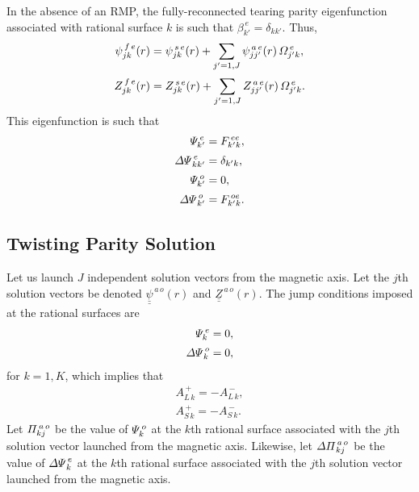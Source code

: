 \documentclass[12pt,prb,aps,notitlepage]{revtex4-1}
\begin{document}
In the absence of an RMP, the fully-reconnected tearing parity eigenfunction associated with rational surface $k$ is such that $\beta^{\,e}_{k'} = \delta_{kk'}$. 
Thus,
\begin{align}
\psi^{\,f\,e}_{jk}(r) &= \psi^{\,s\,e}_{jk}(r) + \sum_{j'=1,J} \psi_{jj'}^{\,a\,e}(r)\,{\mit\Omega}^{\,e}_{j'k},\\[0.5ex]
Z^{\,f\,e}_{jk}(r) &= Z^{\,s\,e}_{jk}(r) + \sum_{j'=1,J} Z_{jj'}^{\,a\,e}(r)\,{\mit\Omega}^{\,e}_{j'k}.
\end{align}
This eigenfunction is such that
\begin{align}
{\mit\Psi}^{\,e}_{k'} &= F^{\,ee}_{k'k},\\[0.5ex]
{\mit\Delta\Psi}^{\,e}_{kk'} &= \delta_{k'k},\\[0.5ex]
{\mit\Psi}^{\,o}_{k'} &= 0,\\[0.5ex]
{\mit\Delta\Psi}^{\,o}_{k'} &= F^{\,oe}_{k'k}.
\end{align}

\subsection{Twisting Parity Solution}
Let us launch $J$ independent solution vectors from the magnetic axis.
Let the $j$th solution vectors be denoted $\underline{\underline{\psi}}^{\,a\,o}(r)$ and $\underline{\underline{Z}}^{\,a\,o}(r)$.
The jump conditions imposed at the rational surfaces are
\begin{align}
{\mit\Psi}_k^{\,e} &= 0,\\[0.5ex]
{\mit\Delta\Psi}_k^{\,o} &= 0,
\end{align}
for $k=1,K$, 
which implies that
\begin{align}
A_{L\,k}^{\,+} = -A_{L\,k}^{\,-},\\[0.5ex]
A_{S\,k}^{\,+} = -A_{S\,k}^{\,-}.
\end{align}
Let ${\mit\Pi}_{kj}^{\,a\,o}$ be the value of ${\mit\Psi}_{k}^{\,o}$ at the $k$th rational surface associated with the $j$th solution vector launched from the magnetic axis. Likewise, let ${\mit\Delta\Pi}_{kj}^{\,a\,o}$ be the value of ${\mit\Delta\Psi}_{k}^{\,e}$
at the $k$th rational surface associated with the $j$th solution vector launched from the magnetic axis. 
\end{document}
